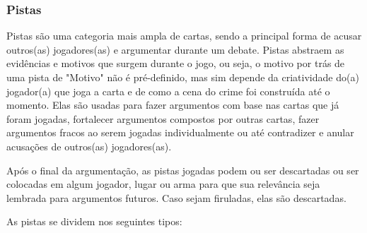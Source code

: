 \documentclass[a4paper, 11pt]{article}
\begin{document}
	\subsubsection*{Pistas}

		Pistas são uma categoria mais ampla de cartas, sendo a principal forma de acusar outros(as) jogadores(as) e argumentar durante um debate. Pistas abstraem as evidências e motivos que surgem durante o jogo, ou seja, o motivo por trás de uma pista de "Motivo" não é pré-definido, mas sim depende da criatividade do(a) jogador(a) que joga a carta e de como a cena do crime foi construída até o momento. Elas são usadas para fazer argumentos com base nas cartas que já foram jogadas, fortalecer argumentos compostos por outras cartas, fazer argumentos fracos ao serem jogadas individualmente ou até contradizer e anular acusações de outros(as) jogadores(as). 
		
		Após o final da argumentação, as pistas jogadas podem ou ser descartadas ou ser colocadas em algum jogador, lugar ou arma para que sua relevância seja lembrada para argumentos futuros. Caso sejam firuladas, elas são descartadas.
		
		As pistas se dividem nos seguintes tipos:
\end{document}
